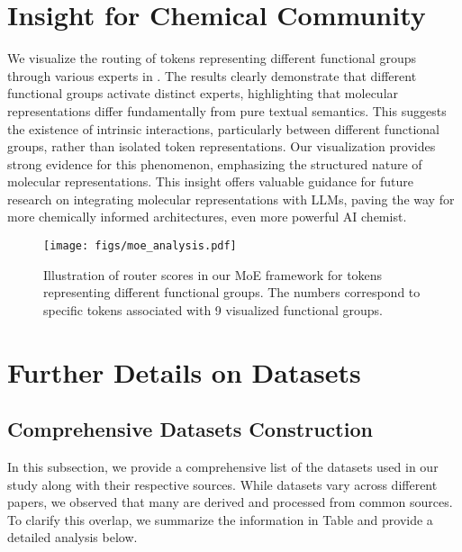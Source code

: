 \newpage
\appendix
\onecolumn



\section{Insight for Chemical Community}
We visualize the routing of tokens representing different functional groups through various experts in \method. The results clearly demonstrate that different functional groups activate distinct experts, highlighting that molecular representations differ fundamentally from pure textual semantics. This suggests the existence of intrinsic interactions, particularly between different functional groups, rather than isolated token representations. Our visualization provides strong evidence for this phenomenon, emphasizing the structured nature of molecular representations. This insight offers valuable guidance for future research on integrating molecular representations with LLMs, paving the way for more chemically informed architectures, even more powerful AI chemist.

\begin{figure*}[h]
    \centering
    \texttt{[image: figs/moe\_analysis.pdf]} 
    \vspace{-0.3cm}
    \caption{Illustration of router scores in our MoE framework for tokens representing different functional groups. The numbers correspond to specific tokens associated with 9 visualized functional groups.}
    \label{fig:moe}
    \vspace{-0.3cm}
\end{figure*}

\section{Further Details on Datasets}
\label{app:dataset detail}

\subsection{Comprehensive Datasets Construction}
In this subsection, we provide a comprehensive list of the datasets used in our study along with their respective sources. While datasets vary across different papers, we observed that many are derived and processed from common sources. To clarify this overlap, we summarize the information in Table and provide a detailed analysis below.

